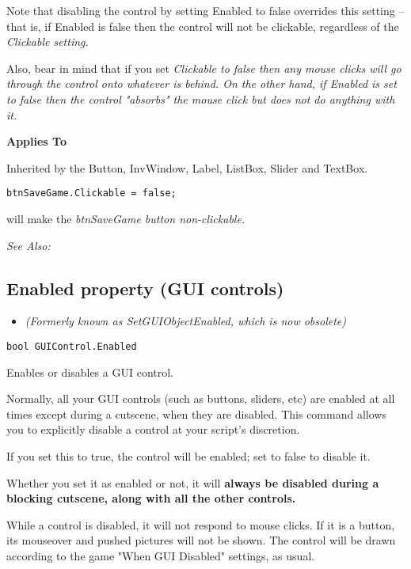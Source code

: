 Note that disabling the control by setting Enabled to false overrides this setting -- that is, if Enabled
is false then the control will not be clickable, regardless of the \it{Clickable} setting.

Also, bear in mind that if you set \it{Clickable} to false then any mouse clicks will go through the control
onto whatever is behind. On the other hand, if \it{Enabled} is set to false then the control "absorbs"
the mouse click but does not do anything with it.

\bf{Applies To}

Inherited by the Button, InvWindow, Label, ListBox, Slider and TextBox.

\begin{verbatim}
btnSaveGame.Clickable = false;
\end{verbatim}
will make the \it{btnSaveGame} button non-clickable.

\it{See Also:} 


\subsection{Enabled property (GUI controls)}\label{GUIControl.Enabled}%

\begin{itemize}
\item \it{(Formerly known as SetGUIObjectEnabled, which is now obsolete)}
\end{itemize}

\begin{verbatim}
bool GUIControl.Enabled
\end{verbatim}
Enables or disables a GUI control.

Normally, all your GUI controls (such as buttons, sliders, etc) are enabled at all times
except during a cutscene, when they are disabled. This command allows you to explicitly
disable a control at your script's discretion.

If you set this to true, the control will be enabled; set to false to disable it.

Whether you set it as enabled or not, it will \bf{always} be disabled during a blocking
cutscene, along with all the other controls.

While a control is disabled, it will not respond to mouse clicks. If it is a button, its
mouseover and pushed pictures will not be shown. The control will be drawn according to
the game "When GUI Disabled" settings, as usual.

